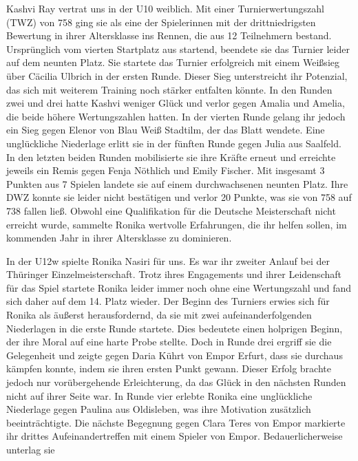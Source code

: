 \documentclass[a4paper,ngerman]{tui-algo-seminar}
\begin{document}
Kashvi Ray vertrat uns in der U10 weiblich. Mit einer Turnierwertungszahl (TWZ) von 758 ging sie als eine der Spielerinnen mit der drittniedrigsten Bewertung in ihrer Altersklasse ins Rennen, die aus 12 Teilnehmern bestand. Ursprünglich vom vierten Startplatz aus startend, beendete sie das Turnier leider auf dem neunten Platz. Sie startete das Turnier erfolgreich mit einem Weißsieg über Cäcilia Ulbrich in der ersten Runde. Dieser Sieg unterstreicht ihr Potenzial, das sich mit weiterem Training noch stärker entfalten könnte. In den Runden zwei und drei hatte Kashvi weniger Glück und verlor gegen Amalia und Amelia, die beide höhere Wertungszahlen hatten. In der vierten Runde gelang ihr jedoch ein Sieg gegen Elenor von Blau Weiß Stadtilm, der das Blatt wendete. Eine unglückliche Niederlage erlitt sie in der fünften Runde gegen Julia aus Saalfeld. In den letzten beiden Runden mobilisierte sie ihre Kräfte erneut und erreichte jeweils ein Remis gegen Fenja Nöthlich und Emily Fischer. Mit insgesamt 3 Punkten aus 7 Spielen landete sie auf einem durchwachsenen neunten Platz. Ihre DWZ konnte sie leider nicht bestätigen und verlor 20 Punkte, was sie von 758 auf 738 fallen ließ. Obwohl eine Qualifikation für die Deutsche Meisterschaft nicht erreicht wurde, sammelte Ronika wertvolle Erfahrungen, die ihr helfen sollen, im kommenden Jahr in ihrer Altersklasse zu dominieren.

In der U12w spielte Ronika Nasiri für uns. Es war ihr zweiter Anlauf bei der Thüringer Einzelmeisterschaft. Trotz ihres Engagements und ihrer Leidenschaft für das Spiel startete Ronika leider immer noch ohne eine Wertungszahl und fand sich daher auf dem 14. Platz wieder. Der Beginn des Turniers erwies sich für Ronika als äußerst herausfordernd, da sie mit zwei aufeinanderfolgenden Niederlagen in die erste Runde startete. Dies bedeutete einen holprigen Beginn, der ihre Moral auf eine harte Probe stellte. Doch in Runde drei ergriff sie die Gelegenheit und zeigte gegen Daria Kührt von Empor Erfurt, dass sie durchaus kämpfen konnte, indem sie ihren ersten Punkt gewann. Dieser Erfolg brachte jedoch nur vorübergehende Erleichterung, da das Glück in den nächsten Runden nicht auf ihrer Seite war. In Runde vier erlebte Ronika eine unglückliche Niederlage gegen Paulina aus Oldisleben, was ihre Motivation zusätzlich beeinträchtigte. Die nächste Begegnung gegen Clara Teres von Empor markierte ihr drittes Aufeinandertreffen mit einem Spieler von Empor. Bedauerlicherweise unterlag sie
\end{document}
